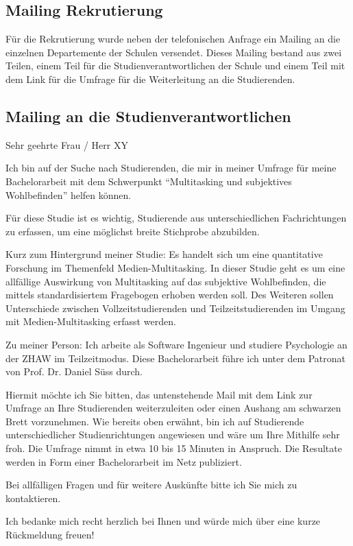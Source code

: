 \begin{RaggedRight}
\section{Mailing Rekrutierung}\label{appendix.mailing}
Für die Rekrutierung wurde neben der telefonischen Anfrage ein Mailing an die einzelnen Departemente der Schulen versendet. Dieses Mailing bestand aus zwei Teilen, einem Teil für die Studienverantwortlichen der Schule und einem Teil mit dem Link für die Umfrage für die Weiterleitung an die Studierenden.

\subsection{Mailing an die Studienverantwortlichen}\label{subsection.mailingVerantwortliche}
Sehr geehrte Frau / Herr XY

Ich bin auf der Suche nach Studierenden, die mir in meiner Umfrage für meine Bachelorarbeit mit dem Schwerpunkt “Multitasking und subjektives Wohlbefinden” helfen können.

Für diese Studie ist es wichtig, Studierende aus unterschiedlichen Fachrichtungen zu erfassen, um eine möglichst breite Stichprobe abzubilden.

Kurz zum Hintergrund meiner Studie: Es handelt sich um eine quantitative Forschung im Themenfeld Medien-Multitasking. In dieser Studie geht es um eine allfällige Auswirkung von Multitasking auf das subjektive Wohlbefinden, die mittels standardisiertem Fragebogen erhoben werden soll. Des Weiteren sollen Unterschiede zwischen Vollzeitstudierenden und Teilzeitstudierenden im Umgang mit Medien-Multitasking erfasst werden.

Zu meiner Person: Ich arbeite als Software Ingenieur und studiere Psychologie an der ZHAW im Teilzeitmodus. Diese Bachelorarbeit führe ich unter dem Patronat von Prof. Dr. Daniel Süss durch.

Hiermit möchte ich Sie bitten, das untenstehende Mail mit dem Link zur Umfrage an Ihre Studierenden weiterzuleiten oder einen Aushang am schwarzen Brett vorzunehmen. Wie bereits oben erwähnt, bin ich auf Studierende unterschiedlicher Studienrichtungen angewiesen und wäre um Ihre Mithilfe sehr froh. Die Umfrage nimmt in etwa 10 bis 15 Minuten in Anspruch. Die Resultate werden in Form einer Bachelorarbeit im Netz publiziert.

Bei allfälligen Fragen und für weitere Auskünfte bitte ich Sie mich zu kontaktieren.

Ich bedanke mich recht herzlich bei Ihnen und würde mich über eine kurze Rückmeldung freuen!


\end{RaggedRight}
